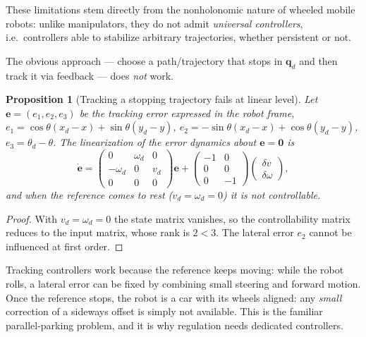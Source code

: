 \documentclass[11pt,a4paper]{article}
\theoremstyle{plain}
\newtheorem{proposition}[theorem]{Proposition}
\theoremstyle{definition}
\theoremstyle{remark}
\begin{document}
These limitations stem directly from the nonholonomic nature of wheeled mobile robots: unlike manipulators, they do not admit \emph{universal controllers}, i.e.\ controllers able to stabilize arbitrary trajectories, whether persistent or not.
\begin{center}
\end{center}
The obvious approach --- choose a path/trajectory that stops in $\bm q_d$ and then track it via feedback --- does \emph{not} work.

\begin{proposition}[Tracking a stopping trajectory fails at linear level]\label{prop:stopfail}
Let $\bm e=(e_1,e_2,e_3)$ be the tracking error expressed in the robot frame, $e_1=\cos\theta(x_d-x)+\sin\theta(y_d-y)$, $e_2=-\sin\theta(x_d-x)+\cos\theta(y_d-y)$, $e_3=\theta_d-\theta$. The linearization of the error dynamics about $\bm e=\bm 0$ is
\[
\dot{\bm e}=\begin{pmatrix}0&\omega_d&0\\-\omega_d&0&v_d\\0&0&0\end{pmatrix}\bm e+\begin{pmatrix}-1&0\\0&0\\0&-1\end{pmatrix}\begin{pmatrix}\delta v\\ \delta\omega\end{pmatrix},
\]
and when the reference comes to rest ($v_d=\omega_d=0$) it is \emph{not controllable}.
\end{proposition}

\begin{proof}
With $v_d=\omega_d=0$ the state matrix vanishes, so the controllability matrix reduces to the input matrix, whose rank is $2<3$. The lateral error $e_2$ cannot be influenced at first order.
\end{proof}

\begin{intuition}
Tracking controllers work because the reference keeps moving: while the robot rolls, a lateral error can be fixed by combining small steering and forward motion. Once the reference stops, the robot is a car with its wheels aligned: any \emph{small} correction of a sideways offset is simply not available. This is the familiar parallel-parking problem, and it is why regulation needs dedicated controllers.
\end{intuition}
\end{document}
